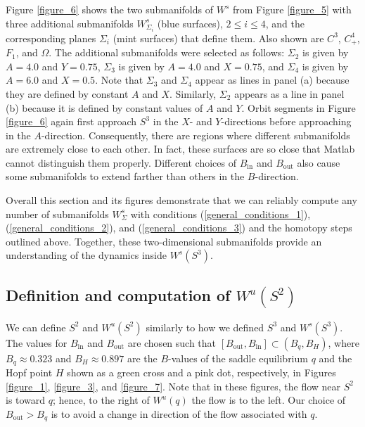 \documentclass{ws-ijbc}
\begin{document}
Figure \ref{figure_6} shows the two submanifolds of $W^{s}$ from Figure \ref{figure_5} with three additional submanifolds $W^s_{\Sigma_i}$ (blue surfaces), $2 \leq i \leq 4$, and the corresponding planes $\Sigma_i$ (mint surfaces) that define them.  Also shown are $C^3$, $C^4_+$, $F_1$, and $\Omega$.  The additional submanifolds were selected as follows: $\Sigma_2$ is given by $A=4.0$ and $Y=0.75$, $\Sigma_3$ is given by $A=4.0$ and $X=0.75$, and $\Sigma_4$ is given by $A=6.0$ and $X=0.5$.  Note that  $\Sigma_3$ and $\Sigma_4$ appear as lines in panel (a) because they are defined by constant $A$ and $X$.  Similarly, $\Sigma_2$ appears as a line in panel (b) because it is defined by constant values of $A$ and $Y$.  Orbit segments in Figure \ref{figure_6} again first approach $S^3$ in the $X$- and $Y$-directions before approaching in the $A$-direction.  Consequently, there are regions where different submanifolds are extremely close to each other.  In fact, these surfaces are so close that Matlab cannot distinguish them properly.  Different choices of $B_{\text{in}}$ and $B_{\text{out}}$ also cause some submanifolds to extend farther than others in the $B$-direction.

Overall this section and its figures demonstrate that we can reliably compute any number of submanifolds $W^s_\Sigma$ with conditions (\ref{general_conditions_1}),  (\ref{general_conditions_2}), and (\ref{general_conditions_3}) and the homotopy steps outlined above.  Together, these two-dimensional submanifolds provide an understanding of the dynamics inside $W^s(S^3)$.

\subsection{Definition and computation of $W^{u}(S^2)$}  

We can define $S^2$ and $W^u(S^2)$ similarly to how we defined $S^3$ and $W^s(S^3)$.  The values for $B_{\text{in}}$ and $B_{\text{out}}$ are chosen such that $[B_{\text{out}}, B_{\text{in}}] \subset (B_q, B_H)$, where $B_q \approx 0.323$ and $B_H \approx 0.897$ are the $B$-values of the saddle equilibrium $q$ and the Hopf point $H$ shown as a green cross and a pink dot, respectively, in Figures \ref{figure_1}, \ref{figure_3}, and \ref{figure_7}. Note that in these figures, the flow near $S^2$ is toward $q$; hence, to the right of $W^u(q)$ the flow is to the left.  Our choice of $B_{\text{out}}>B_{q}$ is to avoid a change in direction of the flow associated with $q$.
\end{document}
